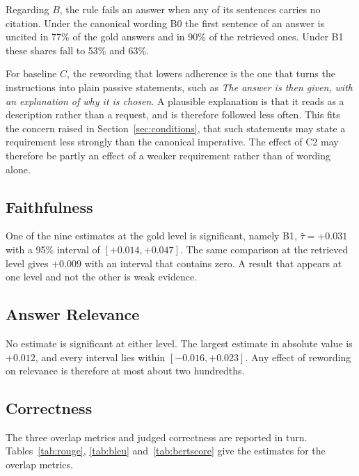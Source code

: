 \documentclass[12pt,a4paper,oneside]{scrreprt}
\begin{document}
Regarding $B$, the rule fails an answer when any of its sentences carries no citation. Under the canonical wording B0 the first sentence of an answer is uncited in 77\% of the gold answers and in 90\% of the retrieved ones. Under B1 these shares fall to 53\% and 63\%. 

For baseline $C$, the rewording that lowers adherence is the one that turns the instructions into plain passive statements, such as \textit{The answer is then given, with an explanation of why it is chosen}. A plausible explanation is that it reads as a description rather than a request, and is therefore followed less often. This fits the concern raised in Section~\ref{sec:conditions}, that such statements may state a requirement less strongly than the canonical imperative. The effect of C2 may therefore be partly an effect of a weaker requirement rather than of wording alone.

\subsection{Faithfulness}

One of the nine estimates at the gold level is significant, namely B1, $\hat{\tau} = +0.031$ with a 95\% interval of $[+0.014, +0.047]$. The same comparison at the retrieved level gives $+0.009$ with an interval that contains zero. A result that appears at one level and not the other is weak evidence.

\subsection{Answer Relevance}

No estimate is significant at either level. The largest estimate in absolute value is $+0.012$, and every interval lies within $[-0.016, +0.023]$. Any effect of rewording on relevance is therefore at most about two hundredths.

\subsection{Correctness}

The three overlap metrics and judged correctness are reported in turn. Tables~\ref{tab:rouge}, \ref{tab:bleu} and~\ref{tab:bertscore} give the estimates for the overlap metrics.
\end{document}
